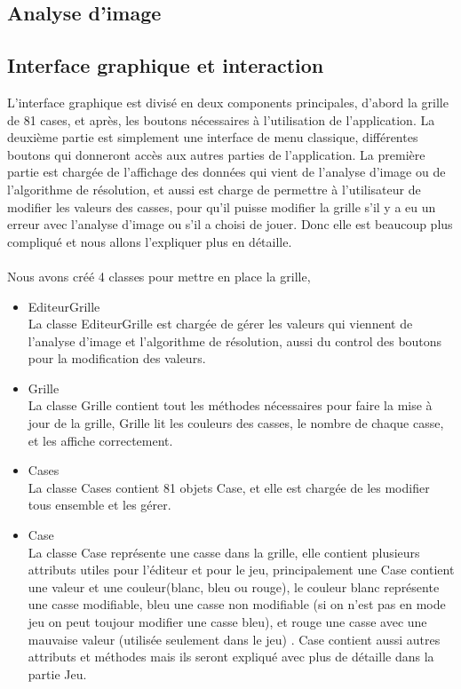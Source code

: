 \documentclass{article}
\begin{document}
\subsection{Analyse d'image}
\subsection{Interface graphique et interaction}
L’interface graphique est divisé en deux components principales, d’abord la grille de 81 cases, et après, les boutons nécessaires à l'utilisation de l’application. La deuxième partie est simplement une interface de menu classique, différentes boutons qui donneront accès aux autres parties de l’application. La première partie est chargée de l’affichage des données qui vient de l’analyse d’image ou de l'algorithme de résolution, et aussi est charge de permettre à l'utilisateur de modifier les valeurs des casses, pour qu'il puisse modifier la grille s’il y a eu un erreur avec l’analyse d’image ou s’il a choisi de jouer. Donc elle est beaucoup plus compliqué et nous allons l’expliquer plus en détaille.
\\
\\
Nous avons créé 4 classes pour  mettre en place la grille, 

\begin{itemize}
    \item EditeurGrille \\
La classe EditeurGrille est chargée de gérer les valeurs qui viennent de l’analyse d’image et l’algorithme de résolution, aussi du control des boutons pour la modification des valeurs. 

    \item Grille \\
La classe Grille contient tout les méthodes nécessaires pour faire la mise à jour de la grille, Grille lit les couleurs des casses, le nombre de chaque casse, et les affiche correctement.
    
    \item Cases \\
La classe Cases contient 81 objets Case, et elle est chargée de les modifier tous ensemble et les gérer. 
    
    \item Case \\
La classe Case représente une casse dans la grille, elle contient plusieurs attributs utiles pour l'éditeur et pour le jeu, principalement une Case contient une valeur et une couleur(blanc, bleu ou rouge), le couleur blanc représente une casse modifiable, bleu une casse non modifiable (si on n’est pas en mode jeu on peut toujour modifier une casse bleu), et rouge une casse avec une mauvaise valeur (utilisée seulement dans le jeu) . Case contient aussi autres attributs et méthodes mais ils seront expliqué avec plus de détaille dans la partie Jeu.


\end{itemize}\\
\end{document}
